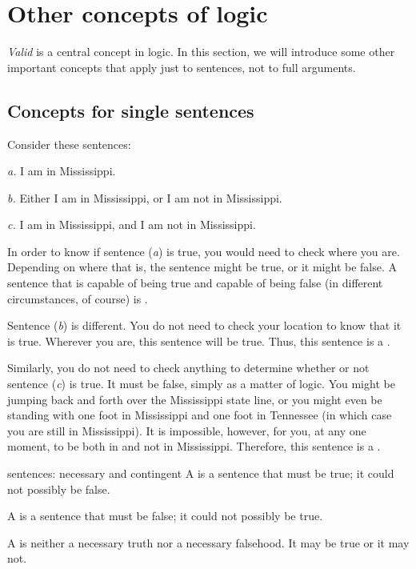 


\chapter{Other concepts of logic}\label{s:BasicNotions}

\textit{Valid} is a central concept in logic. In this section, we will introduce some other important concepts that apply just to sentences, not to full arguments. 

\section{Concepts for single sentences}\label{s:nec-truth}

Consider these sentences:
	\begin{earg}
		\item[\textit{a.}] I am in Mississippi.
		\item[\textit{b.}] Either I am in Mississippi, or I am not in Mississippi.
		\item[\textit{c.}] I am in Mississippi, and I am not in Mississippi.
	\end{earg}
In order to know if sentence (\textit{a}) is true, you would need to check where you are. Depending on where that is, the sentence might be true, or it might be false. A sentence that is capable of being true and capable of being false (in different circumstances, of course) is .

Sentence (\textit{b}) is different. You do not need to check your location to know that it is true. Wherever you are, this sentence will be true. Thus, this sentence is a . 

Similarly, you do not need to check anything to determine whether or not sentence (\textit{c}) is true. It must be false, simply as a matter of logic. You might be jumping back and forth over the Mississippi state line, or you might even be standing with one foot in Mississippi and one foot in Tennessee (in which case you are still in Mississippi). It is impossible, however, for you, at any one moment, to be both in and not in Mississippi. Therefore, this sentence is a .

\begin{factboxy}{sentences: necessary and contingent}
\noindent A  is a sentence that must be true; it could not possibly be false.

\noindent A  is a sentence that must be false; it could not possibly be true.

\noindent A  is neither a necessary truth nor a necessary falsehood. It may be true or it may not.
\end{factboxy}

